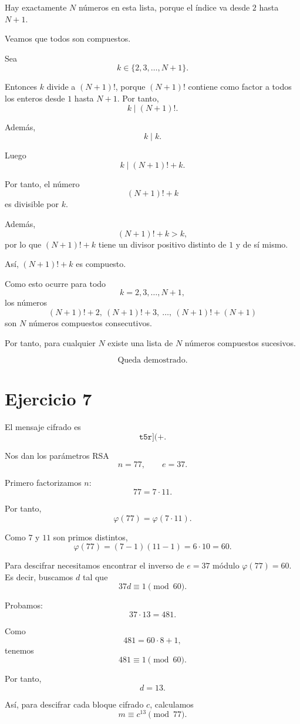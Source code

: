 \documentclass[12pt]{article}
\begin{document}
Hay exactamente \(N\) números en esta lista, porque el índice va desde \(2\) hasta \(N+1\).

Veamos que todos son compuestos.

Sea
\[
k\in\{2,3,\dots,N+1\}.
\]

Entonces \(k\) divide a \((N+1)!\), porque \((N+1)!\) contiene como factor a todos los enteros desde \(1\) hasta \(N+1\). Por tanto,
\[
k\mid (N+1)!.
\]

Además,
\[
k\mid k.
\]

Luego
\[
k\mid (N+1)!+k.
\]

Por tanto, el número
\[
(N+1)!+k
\]
es divisible por \(k\).

Además,
\[
(N+1)!+k>k,
\]
por lo que \((N+1)!+k\) tiene un divisor positivo distinto de \(1\) y de sí mismo.

Así, \((N+1)!+k\) es compuesto.

Como esto ocurre para todo
\[
k=2,3,\dots,N+1,
\]
los números
\[
(N+1)!+2,\ (N+1)!+3,\ \dots,\ (N+1)!+(N+1)
\]
son \(N\) números compuestos consecutivos.

Por tanto, para cualquier \(N\) existe una lista de \(N\) números compuestos sucesivos.

\[
\boxed{\text{Queda demostrado.}}
\]

\section*{Ejercicio 7}

El mensaje cifrado es
\[
\texttt{t5r](+}.
\]

Nos dan los parámetros RSA
\[
n=77,
\qquad
e=37.
\]

Primero factorizamos \(n\):
\[
77=7\cdot 11.
\]

Por tanto,
\[
\varphi(77)=\varphi(7\cdot 11).
\]

Como \(7\) y \(11\) son primos distintos,
\[
\varphi(77)=(7-1)(11-1)=6\cdot 10=60.
\]

Para descifrar necesitamos encontrar el inverso de \(e=37\) módulo \(\varphi(77)=60\). Es decir, buscamos \(d\) tal que
\[
37d\equiv 1\pmod{60}.
\]

Probamos:
\[
37\cdot 13=481.
\]

Como
\[
481=60\cdot 8+1,
\]
tenemos
\[
481\equiv 1\pmod{60}.
\]

Por tanto,
\[
d=13.
\]

Así, para descifrar cada bloque cifrado \(c\), calculamos
\[
m\equiv c^{13}\pmod{77}.
\]
\end{document}
